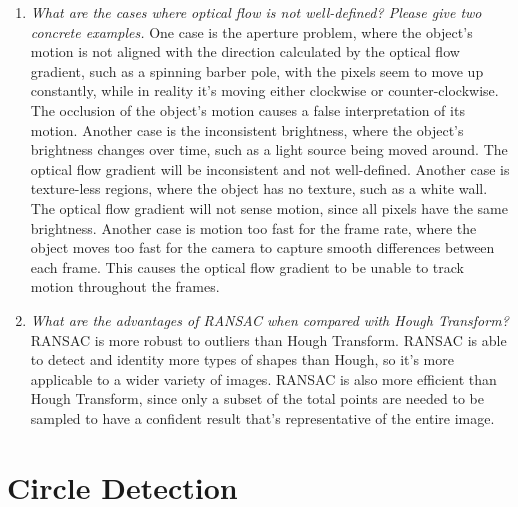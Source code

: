 \documentclass[11pt]{article}
\begin{document}
\begin{enumerate}
        \item \textit{What are the cases where optical flow is not well-defined? Please give two concrete examples.}\newline
        One case is the aperture problem, where the object's motion is not aligned with the direction calculated by the
        optical flow gradient, such as a spinning barber pole, with the pixels seem to move up constantly, while in
        reality it's moving either clockwise or counter-clockwise. The occlusion of the object's motion causes a false
        interpretation of its motion.\newline
        Another case is the inconsistent brightness, where the object's brightness changes over time, such as a
        light source being moved around. The optical flow gradient will be inconsistent and not well-defined.\newline
        Another case is texture-less regions, where the object has no texture, such as a white wall. The optical flow
        gradient will not sense motion, since all pixels have the same brightness.\newline
        Another case is motion too fast for the frame rate, where the object moves too fast for the camera to capture
        smooth differences between each frame. This causes the optical flow gradient to be unable to track motion
        throughout the frames.\newline

        \item \textit{What are the advantages of RANSAC when compared with Hough Transform?}\newline
        RANSAC is more robust to outliers than Hough Transform. RANSAC is able to detect and identity more types of
        shapes than Hough, so it's more applicable to a wider variety of images. RANSAC is also more efficient than Hough
        Transform, since only a subset of the total points are needed to be sampled to have a confident result that's
        representative of the entire image.\newline

    \end{enumerate}


    \section{Circle Detection}
\end{document}
